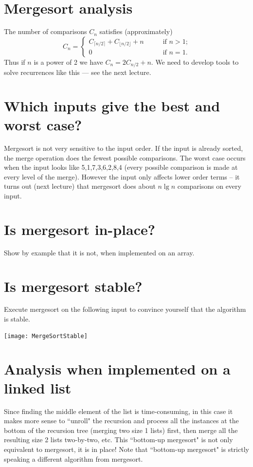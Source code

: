 \section{Mergesort analysis}
The number of comparisons $C_n$ satisfies (approximately)
$$ C_n  = \left\{
\begin{array}{ll}
	C_{\lceil n/2 \rceil} + C_{\lfloor n/2 \rfloor} + n & \qquad \text{if }n > 1\text{;} \\
														0 & \qquad \text{if }n = 1\text{.}
\end{array}\right.$$
Thus if $n$ is a power of 2 we have $C_n = 2C_{n/2} + n$. We need to develop tools to solve recurrences like this --- see the next lecture.

\section{Which inputs give the best and worst case?}
Mergesort is not very sensitive to the input order. 
If the input is already sorted, the merge operation does the fewest possible comparisons. 
The worst case occurs when the input looks like 5,1,7,3,6,2,8,4 (every possible comparison is made at every level of the merge). 
However the input only affects lower order terms -- it turns out 
(next lecture)  that mergesort does about $n \lg n$ comparisons on every input.

\section{Is mergesort in-place?}
\begin{Boxample}[6]
Show by example that it is not, when implemented on an array.
\end{Boxample}

\section{Is mergesort stable?}

\begin{Boxample}[0]
Execute mergesort on the following input to convince yourself that the algorithm is stable.
\begin{center}
\texttt{[image: MergeSortStable]} 
\end{center} 
\end{Boxample}

\section{Analysis when implemented on a linked list}
Since finding the middle element of the list is time-consuming, in this case it makes more sense to ``unroll" the recursion 
and process all the instances at the bottom of the recursion tree (merging two size 1 lists) first, then merge all the resulting size 2 lists two-by-two, etc. 
This ``bottom-up mergesort" is not only equivalent to mergesort, it is in place! Note that ``bottom-up mergesort" is strictly speaking a different algorithm from mergesort.

